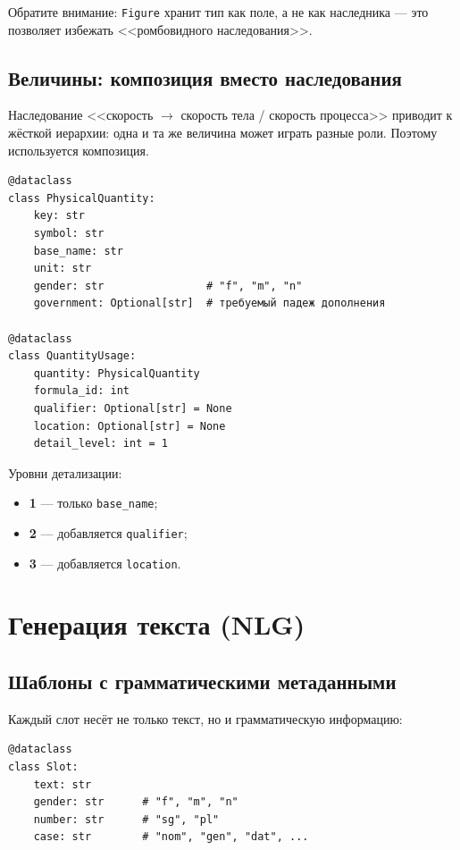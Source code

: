 \documentclass[12pt,a4paper]{article}
\newcommand{\code}[1]{\texttt{#1}}
\begin{document}
\noindent
Обратите внимание: \code{Figure} хранит тип как поле, а не как
наследника --- это позволяет избежать <<ромбовидного наследования>>.

\subsection{Величины: композиция вместо наследования}

Наследование <<скорость \(\to\) скорость тела / скорость процесса>>
приводит к жёсткой иерархии: одна и та же величина может играть
разные роли. Поэтому используется композиция.

\begin{verbatim}
@dataclass
class PhysicalQuantity:
    key: str
    symbol: str
    base_name: str
    unit: str
    gender: str                # "f", "m", "n"
    government: Optional[str]  # требуемый падеж дополнения

@dataclass
class QuantityUsage:
    quantity: PhysicalQuantity
    formula_id: int
    qualifier: Optional[str] = None
    location: Optional[str] = None
    detail_level: int = 1
\end{verbatim}

\noindent
Уровни детализации:
\begin{itemize}
    \item \textbf{1} --- только \code{base_name};
    \item \textbf{2} --- добавляется \code{qualifier};
    \item \textbf{3} --- добавляется \code{location}.
\end{itemize}

\section{Генерация текста (NLG)}

\subsection{Шаблоны с грамматическими метаданными}

Каждый слот несёт не только текст, но и грамматическую информацию:

\begin{verbatim}
@dataclass
class Slot:
    text: str
    gender: str      # "f", "m", "n"
    number: str      # "sg", "pl"
    case: str        # "nom", "gen", "dat", ...
\end{verbatim}
\end{document}
